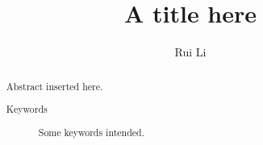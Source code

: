 \documentclass[%
 reprint,
 amsmath,amssymb,
 aps,
10.5pt,
]{revtex4-1}
\begin{document}

\title{A title here}%

\author{Rui Li}
%





\begin{abstract}
Abstract inserted here.
\begin{description}
\item[Keywords]
Some keywords intended.
\end{description}
\end{abstract}

\maketitle

\tableofcontents
\end{document}
